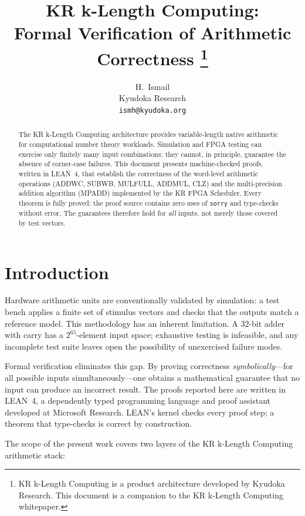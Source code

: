 \documentclass[11pt,a4paper]{article}
\title{KR k-Length Computing: \\
Formal Verification of Arithmetic Correctness%
\footnote{KR k-Length Computing is a product architecture developed
by Kyudoka Research.  This document is a companion to the
KR k-Length Computing whitepaper.}}
\author{H.\ Ismail \\
  Kyudoka Research \\
  \texttt{ismh@kyudoka.org}}
\date{}
\begin{document}
\maketitle

\begin{abstract}
The KR k-Length Computing architecture provides variable-length
native arithmetic for computational number theory workloads.
Simulation and FPGA testing can exercise only finitely many input
combinations; they cannot, in principle, guarantee the absence of
corner-case failures.  This document presents machine-checked proofs,
written in LEAN~4, that establish the correctness of the
word-level arithmetic operations (ADDWC, SUBWB, MULFULL, ADDMUL, CLZ)
and the multi-precision addition algorithm (MPADD) implemented by the
KR FPGA Scheduler.  Every theorem is fully proved: the proof source
contains zero uses of \texttt{sorry} and type-checks without error.
The guarantees therefore hold for \emph{all} inputs, not merely those
covered by test vectors.
\end{abstract}

\tableofcontents

\section{Introduction}
\label{sec:intro}

Hardware arithmetic units are conventionally validated by simulation:
a test bench applies a finite set of stimulus vectors and checks that
the outputs match a reference model.  This methodology has an inherent
limitation.  A 32-bit adder with carry has a $2^{65}$-element input
space; exhaustive testing is infeasible, and any incomplete test suite
leaves open the possibility of unexercised failure modes.

Formal verification eliminates this gap.  By proving correctness
\emph{symbolically}---for all possible inputs simultaneously---one
obtains a mathematical guarantee that no input can produce an
incorrect result.  The proofs reported here are written in LEAN~4, a
dependently typed programming language and proof assistant developed at
Microsoft Research.  LEAN's kernel checks every proof step; a theorem
that type-checks is correct by construction.

The scope of the present work covers two layers of the
KR k-Length Computing arithmetic stack:
\end{document}
